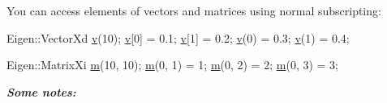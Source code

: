 You can access elements of vectors and matrices using normal subscripting\-:


\begin{DoxyCode}
Eigen::VectorXd \hyperlink{glext_8h_a14cfbe2fc2234f5504618905b69d1e06}{v}(10);
\hyperlink{glext_8h_a14cfbe2fc2234f5504618905b69d1e06}{v}[0] = 0.1;
\hyperlink{glext_8h_a14cfbe2fc2234f5504618905b69d1e06}{v}[1] = 0.2;
\hyperlink{glext_8h_a14cfbe2fc2234f5504618905b69d1e06}{v}(0) = 0.3;
\hyperlink{glext_8h_a14cfbe2fc2234f5504618905b69d1e06}{v}(1) = 0.4;

Eigen::MatrixXi \hyperlink{glext_8h_af593500c283bf1a787a6f947f503a5c2}{m}(10, 10);
\hyperlink{glext_8h_af593500c283bf1a787a6f947f503a5c2}{m}(0, 1) = 1;
\hyperlink{glext_8h_af593500c283bf1a787a6f947f503a5c2}{m}(0, 2) = 2;
\hyperlink{glext_8h_af593500c283bf1a787a6f947f503a5c2}{m}(0, 3) = 3;
\end{DoxyCode}


{\itshape {\bfseries Some notes\-:}}


